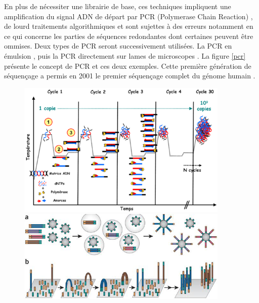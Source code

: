 \documentclass[a4paper,11pt]{article}
\begin{document}
 En plus de nécessiter une librairie de base, ces techniques impliquent une amplification du signal ADN de départ par PCR (Polymerase Chain Reaction) \cite{Saiki1985}, de lourd traitements algorithmiques et sont sujettes à des erreurs notamment en ce qui concerne les parties de séquences redondantes dont certaines peuvent être ommises. Deux types de PCR seront successivement utilisées. La PCR en émulsion \cite{Williams2006}, puis la PCR directement sur lames de microscopes \cite{Shendure2005}. La figure \ref{pcr} présente le concept de PCR et ces deux exemples. Cette première génération de séquençage a permis en 2001 le premier séquençage complet du génome humain \cite{Lander2001,Venter2001}.





 \begin{figure}[H]
\begin{center}
\includegraphics[width=0.9\textwidth]{pcr.png}

\vspace{0.5cm}

\includegraphics[width=0.9\textwidth]{bridgepcr.jpg}
\vspace{0.5cm}


\end{center}
\end{figure}
\end{document}

